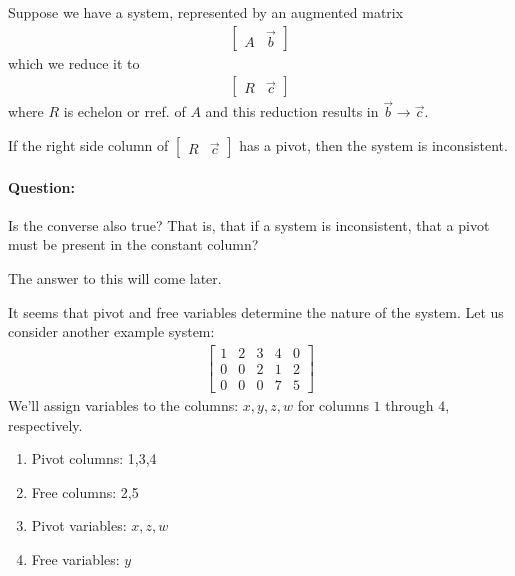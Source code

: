 \documentclass[11pt]{article}
\newcommand{\ques}{\paragraph{Question:}}
\begin{document}
\begin{minipage}[t]{.95\textwidth}
Suppose we have a system, represented by an augmented matrix
\begin{align*}
\left[
\begin{matrix}
A & \vec{b}
\end{matrix}
\right]
\end{align*}
which we reduce it to
\begin{align*}
\left[
\begin{matrix}
R & \vec{c}
\end{matrix}
\right]
\end{align*}
where $R$ is echelon or rref. of $A$ and this reduction results in $\vec{b} \to \vec{c}$.

If the right side column of $\left[
\begin{matrix}
R & \vec{c}
\end{matrix}
\right]$ has a pivot, then the system is inconsistent.
\end{minipage}


\ques Is the converse also true? That is, that if a system is inconsistent, that a pivot must be present in the constant column?

The answer to this will come later.

It seems that pivot and free variables determine the nature of the system. Let us consider another example system:
\begin{align*}
\left[
\begin{matrix}
1 & 2 & 3 & 4 & 0
\\
0 & 0 & 2 & 1 & 2
\\
0 & 0 & 0 & 7 & 5
\end{matrix}
\right]
\end{align*}
We'll assign variables to the columns: $x,y,z,w$ for columns $1$ through $4$, respectively.
\begin{enumerate}
\item{
Pivot columns: 1,3,4
}
\item{
Free columns: 2,5
}
\item{
Pivot variables: $x,z,w$
}
\item{
Free variables: $y$
}
\end{enumerate}
\end{document}
